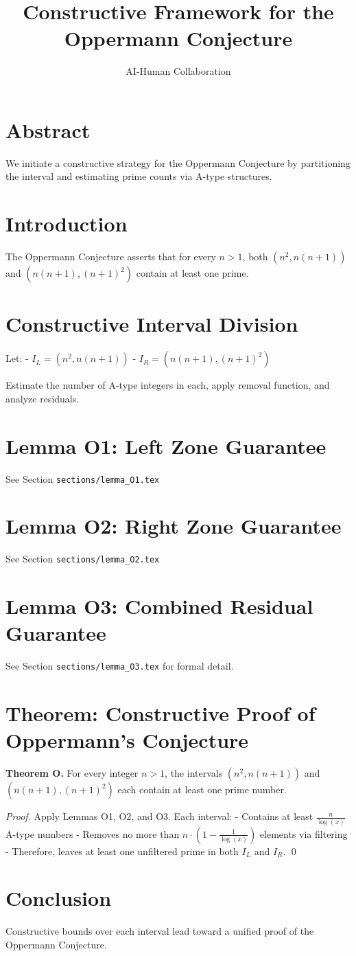 \documentclass{article}
\title{Constructive Framework for the Oppermann Conjecture}
\author{AI-Human Collaboration}
\begin{document}
\maketitle

\section*{Abstract}
We initiate a constructive strategy for the Oppermann Conjecture by partitioning the interval and estimating prime counts via A-type structures.

\section{Introduction}
The Oppermann Conjecture asserts that for every \( n > 1 \), both \( (n^2, n(n+1)) \) and \( (n(n+1), (n+1)^2) \) contain at least one prime.

\section{Constructive Interval Division}
Let:
- \( I_L = (n^2, n(n+1)) \)
- \( I_R = (n(n+1), (n+1)^2) \)

Estimate the number of A-type integers in each, apply removal function, and analyze residuals.

\section{Lemma O1: Left Zone Guarantee}
See Section \texttt{sections/lemma\_O1.tex}

\section{Lemma O2: Right Zone Guarantee}
See Section \texttt{sections/lemma\_O2.tex}

\section{Lemma O3: Combined Residual Guarantee}
See Section \texttt{sections/lemma\_O3.tex} for formal detail.

\section{Theorem: Constructive Proof of Oppermann's Conjecture}

\textbf{Theorem O.}  
For every integer \( n > 1 \), the intervals \( (n^2, n(n+1)) \) and \( (n(n+1), (n+1)^2) \) each contain at least one prime number.

\textit{Proof.}  
Apply Lemmas O1, O2, and O3. Each interval:
- Contains at least \( \frac{n}{\log(x)} \) A-type numbers
- Removes no more than \( n \cdot (1 - \frac{1}{\log(x)}) \) elements via filtering
- Therefore, leaves at least one unfiltered prime in both \( I_L \) and \( I_R \). \qed

\section{Conclusion}
Constructive bounds over each interval lead toward a unified proof of the Oppermann Conjecture.
\end{document}
